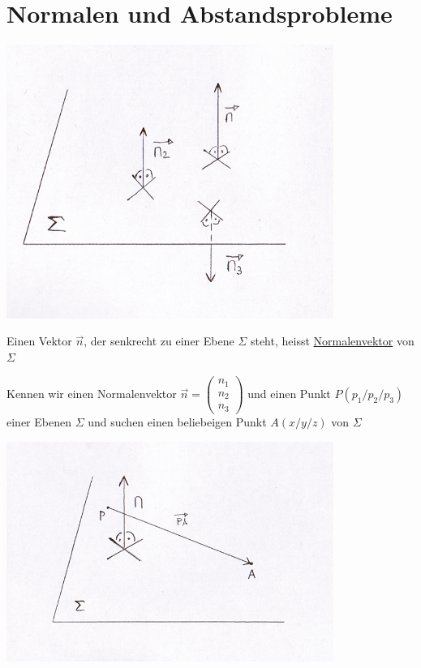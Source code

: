  \section{Normalen und Abstandsprobleme}
\begin{center}
	\includegraphics[width=0.8\textwidth]{imgs/Normalenvektor1.png}
\end{center}
 \begin{mydef}
 	Einen Vektor $\vec{n}$, der senkrecht zu einer Ebene $\Sigma$ steht, heisst \underline{Normalenvektor} von $\Sigma$
 \end{mydef}
Kennen wir einen Normalenvektor $\vec{n} = \begin{pmatrix}n_1\\n_2\\n_3\end{pmatrix}$ und einen Punkt $P(p_1/p_2/p_3)$ einer Ebenen $\Sigma$ und suchen einen beliebeigen Punkt $A(x/y/z)$ von $\Sigma$\\
\begin{center}
	\includegraphics[width=0.8\textwidth]{imgs/Normalenvektor2.png}
\end{center}
